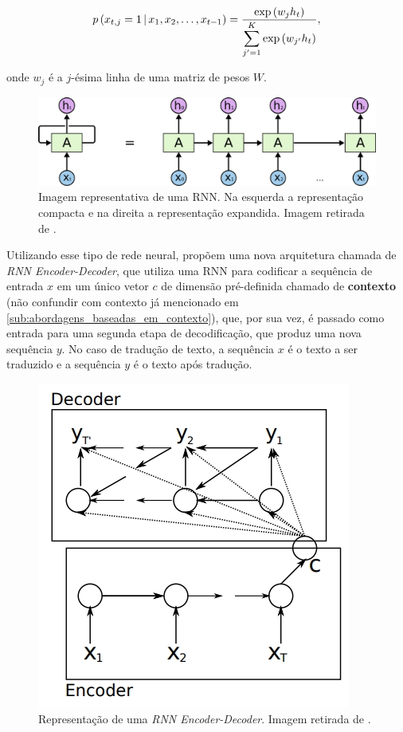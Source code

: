 \begin{equation}
  p\paren{x_{t,j}=1 \cond \seq{x}{t-1}} =
  \dfrac{\exp \paren{w_j h_t}}
  {\spsum{j'=1}{K}\exp\paren{w_{j'}h_t}},
\end{equation}

onde $w_j$ é a $j$-ésima linha de uma matriz de pesos $W$.

\begin{figure}[h]
\centering
\includegraphics[scale=0.24]{Res/rnn.png}
\caption{Imagem representativa de uma RNN. Na esquerda a representação compacta
e na direita a representação expandida. Imagem retirada de
\cite{radhakrishnan:2017:introduction-rnn}.}
\label{rnn.png}
\end{figure}

Utilizando esse tipo de rede neural, \cite{cho-etal:2014:rnn-encoder-decoder}
propõem uma nova arquitetura chamada de \textit{RNN Encoder-Decoder}, que
utiliza uma RNN para codificar a sequência de entrada $x$ em um único vetor $c$
de dimensão pré-definida chamado de \textbf{contexto} (não confundir com
contexto já mencionado em \ref{sub:abordagens_baseadas_em_contexto}), que, por
sua vez, é passado como entrada para uma segunda etapa de decodificação, que
produz uma nova sequência $y$. No caso de tradução de texto, a sequência $x$ é o
texto a ser traduzido e a sequência $y$ é o texto após tradução.

\begin{figure}[h]
\centering
\includegraphics[scale=0.6]{Res/rnn-ed.jpg}
\caption{Representação de uma \textit{RNN Encoder-Decoder}. Imagem retirada de
\cite{cho-etal:2014:rnn-encoder-decoder}.}
\label{rnn-ed.jpg}
\end{figure}

